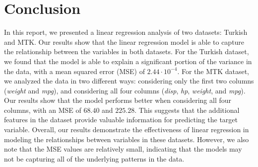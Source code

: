 \documentclass[9pt,technote]{IEEEtran}
\begin{document}
	\section{Conclusion}
	In this report, we presented a linear regression analysis of two datasets: Turkish and MTK. Our results show that the linear regression model is able to capture the relationship between the variables in both datasets.
	For the Turkish dataset, we found that the model is able to explain a significant portion of the variance in the data, with a mean squared error (MSE) of $2.44 \cdot 10^{-4}$.
	For the MTK dataset, we analyzed the data in two different ways: considering only the first two columns (\textit{weight} and \textit{mpg}), and considering all four columns (\textit{disp}, \textit{hp}, \textit{weight}, and \textit{mpg}). Our results show that the model performs better when considering all four columns, with an MSE of $68.40$ and $225.28$. This suggests that the additional features in the dataset provide valuable information for predicting the target variable.
	Overall, our results demonstrate the effectiveness of linear regression in modeling the relationships between variables in these datasets. However, we also note that the MSE values are relatively small, indicating that the models may not be capturing all of the underlying patterns in the data.	


\end{document}
